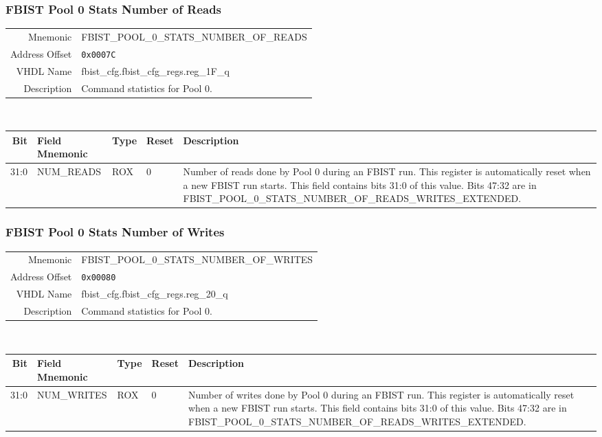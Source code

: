 \subsubsection{FBIST Pool 0 Stats Number of Reads}
\begin{tabular}{ r | p{350px} }
  Mnemonic       & FBIST\_POOL\_0\_STATS\_NUMBER\_OF\_READS \\
  Address Offset & \texttt{0x0007C}                         \\
  VHDL Name      &  fbist\_cfg.fbist\_cfg\_regs.reg\_1F\_q  \\ \hline

  Description &
  Command statistics for Pool 0. \\
\end{tabular}
\\
\begin{tabularx}{\textwidth}{r|l|l|l|X}
  \hline
  Bit   & Field Mnemonic & Type & Reset & Description \\ \hline

  31:0  & NUM\_READS     & ROX  & 0     &

  Number of reads done by Pool 0 during an FBIST run. This register is
  automatically reset when a new FBIST run starts. This field contains
  bits 31:0 of this value. Bits 47:32 are in
  FBIST\_POOL\_0\_STATS\_NUMBER\_OF\_READS\_WRITES\_EXTENDED. \\
\end{tabularx}

\subsubsection{FBIST Pool 0 Stats Number of Writes}
\begin{tabular}{ r | p{350px} }
  Mnemonic       & FBIST\_POOL\_0\_STATS\_NUMBER\_OF\_WRITES \\
  Address Offset & \texttt{0x00080}                          \\
  VHDL Name      &  fbist\_cfg.fbist\_cfg\_regs.reg\_20\_q   \\ \hline

  Description &
  Command statistics for Pool 0. \\
\end{tabular}
\\
\begin{tabularx}{\textwidth}{r|l|l|l|X}
  \hline
  Bit   & Field Mnemonic & Type & Reset & Description \\ \hline

  31:0  & NUM\_WRITES     & ROX  & 0     &

  Number of writes done by Pool 0 during an FBIST run. This register
  is automatically reset when a new FBIST run starts. This field
  contains bits 31:0 of this value. Bits 47:32 are in
  FBIST\_POOL\_0\_STATS\_NUMBER\_OF\_READS\_WRITES\_EXTENDED. \\
\end{tabularx}

